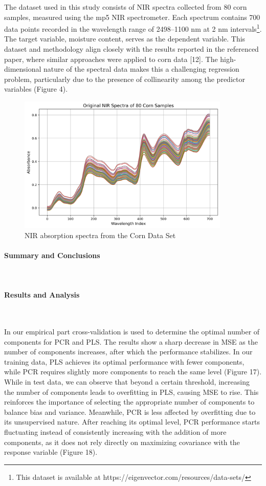 \documentclass[11pt,twoside,a4paper]{article}
\begin{document}
The dataset used in this study consists of NIR spectra collected from 80 corn samples, measured using the mp5 NIR spectrometer. Each spectrum contains 700 data points recorded in the wavelength range of 2498–1100 nm at 2 nm intervals\footnote{This dataset is available at https://eigenvector.com/resources/data-sets/}. The target variable, moisture content, serves as the dependent variable. This dataset and methodology align closely with the results reported in the referenced paper, where similar approaches were applied to corn data [12]. The high-dimensional nature of the spectral data makes this a challenging regression problem, particularly due to the presence of collinearity among the predictor variables (Figure 4).

\begin{figure}[H]
    \centering
    \includegraphics[width=0.9\textwidth]{NIR_first_plot.png}
    \caption{NIR absorption spectra from the Corn Data Set}
    \label{fig:NIR_analysis}
\end{figure}

\paragraph{Summary and Conclusions} \ \

\paragraph{Results and Analysis } \ \

In our empirical part cross-validation is used to determine the optimal number of components for PCR and PLS. The results show a sharp decrease in MSE as the number of components increases, after which the performance stabilizes. In our training data, PLS achieves its optimal performance with fewer components, while PCR requires slightly more components to reach the same level (Figure 17). While in test data, we can observe that beyond a certain threshold, increasing the number of components leads to overfitting in PLS, causing MSE to rise. This reinforces the importance of selecting the appropriate number of components to balance bias and variance. Meanwhile, PCR is less affected by overfitting due to its unsupervised nature. After reaching its optimal level, PCR performance starts fluctuating instead of consistently increasing with the addition of more components, as it does not rely directly on maximizing covariance with the response variable (Figure 18).
\end{document}
